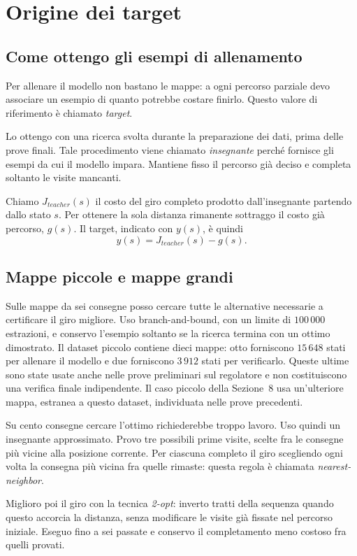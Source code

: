 \section{Origine dei target}
\label{sec:targets}
\subsection{Come ottengo gli esempi di allenamento}
Per allenare il modello non bastano le mappe: a ogni percorso parziale
devo associare un esempio di quanto potrebbe costare finirlo. Questo
valore di riferimento è chiamato \emph{target}.

Lo ottengo con una ricerca svolta durante la preparazione dei dati,
prima delle prove finali. Tale procedimento viene chiamato \emph{insegnante}
perché fornisce gli esempi da cui il modello impara. Mantiene fisso il
percorso già deciso e completa soltanto le visite mancanti.

Chiamo $J_{teacher}(s)$ il costo del giro completo prodotto dall'insegnante
partendo dallo stato $s$. Per ottenere la sola distanza rimanente sottraggo
il costo già percorso, $g(s)$. Il target, indicato con $y(s)$, è quindi
\[
 y(s)=J_{teacher}(s)-g(s).
\]
\subsection{Mappe piccole e mappe grandi}
Sulle mappe da sei consegne posso cercare tutte le alternative necessarie
a certificare il giro migliore. Uso branch-and-bound, con un limite di
$100\,000$ estrazioni, e conservo l'esempio soltanto se la ricerca termina
con un ottimo dimostrato. Il dataset piccolo contiene dieci mappe:
otto forniscono $15\,648$ stati per allenare il modello e due forniscono
$3\,912$ stati per verificarlo. Queste ultime sono state usate anche nelle
prove preliminari sul regolatore e non costituiscono una verifica finale
indipendente. Il caso piccolo della Sezione~8 usa un'ulteriore mappa,
estranea a questo dataset, individuata nelle prove precedenti.

Su cento consegne cercare l'ottimo richiederebbe troppo lavoro. Uso quindi
un insegnante approssimato. Provo tre possibili prime visite, scelte fra
le consegne più vicine alla posizione corrente. Per ciascuna completo il
giro scegliendo ogni volta la consegna più vicina fra quelle rimaste:
questa regola è chiamata \emph{nearest-neighbor}.

Miglioro poi il giro con la tecnica \emph{2-opt}: inverto tratti della
sequenza quando questo accorcia la distanza, senza modificare le visite
già fissate nel percorso iniziale. Eseguo fino a sei passate e conservo
il completamento meno costoso fra quelli provati.

